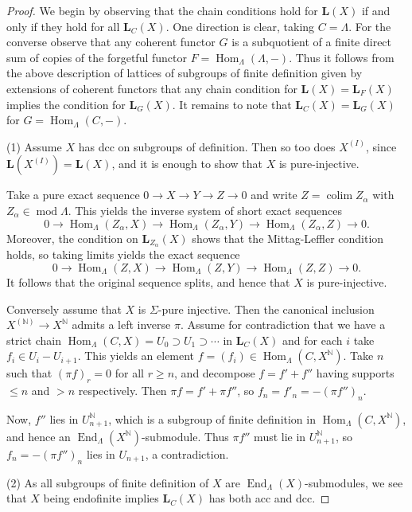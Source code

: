 \documentclass[a4paper]{amsart}
\theoremstyle{plain}
\theoremstyle{definition}
\theoremstyle{remark}
\numberwithin{equation}{section}
\newcommand{\colim}{\operatorname*{colim}}
\newcommand{\End}{\operatorname{End}}
\newcommand{\Hom}{\operatorname{Hom}}
\renewcommand{\mod}{\operatorname{mod}}
\def\bfL{\mathbf L}
\def\bfL{\mathbf L}
\def\bbN{\mathbb N}
\def\La{\Lambda}
\begin{document}
\begin{proof}
  We begin by observing that the chain conditions hold for $\bfL(X)$
  if and only if they hold for all $\bfL_C(X)$. One direction is
  clear, taking $C=\Lambda$. For the converse observe that any
  coherent functor $G$ is a subquotient of a finite direct sum of
  copies of the forgetful functor $F=\Hom_\La(\La,-)$.
  Thus it follows from the above description of lattices of subgroups
  of finite definition given by extensions of coherent functors that any chain
  condition for $\bfL(X)=\bfL_F(X)$ implies the condition for
  $\bfL_G(X)$. It remains to note that  $\bfL_C(X)=\bfL_G(X)$ for $G=\Hom_\La(C,-)$. 

(1) Assume $X$ has dcc on subgroups of definition. Then so too does $X^{(I)}$, since $\bfL(X^{(I)})=\bfL(X)$, and it is enough to show that $X$ is pure-injective.

Take a pure exact sequence $0\to X\to Y\to Z\to 0$ and write $Z=\colim Z_\alpha$ with $Z_\alpha\in\mod\Lambda$. This yields the inverse system of short exact sequences
\[ 0 \to \Hom_\Lambda(Z_\alpha,X) \to \Hom_\Lambda(Z_\alpha,Y) \to \Hom_\Lambda(Z_\alpha,Z) \to 0. \]
Moreover, the condition on $\bfL_{Z_\alpha}(X)$ shows that the Mittag-Leffler condition holds, so taking limits yields the exact sequence
\[ 0 \to \Hom_\Lambda(Z,X) \to \Hom_\Lambda(Z,Y) \to \Hom_\Lambda(Z,Z) \to 0. \]
It follows that the original sequence splits, and hence that $X$ is pure-injective.

Conversely assume that $X$ is $\Sigma$-pure injective. Then the canonical inclusion $X^{(\bbN)}\to X^\bbN$ admits a left inverse $\pi$. Assume for contradiction that we have a strict chain $\Hom_\Lambda(C,X)=U_0\supset U_1\supset\cdots$ in $\bfL_C(X)$ and for each $i$ take $f_i\in U_i-U_{i+1}$. This yields an element $f=(f_i)\in\Hom_\Lambda(C,X^\bbN)$. Take $n$ such that $(\pi f)_r=0$ for all $r\geq n$, and decompose $f=f'+f''$ having supports $\leq n$ and $>n$ respectively. Then $\pi f=f'+\pi f''$, so $f_n=f'_n=-(\pi f'')_n$.

Now, $f''$ lies in $U_{n+1}^\bbN$, which is a subgroup of finite definition in $\Hom_\Lambda(C,X^\bbN)$, and hence an $\End_\Lambda(X^\bbN)$-submodule. Thus $\pi f''$ must lie in $U_{n+1}^\bbN$, so $f_n=-(\pi f'')_n$ lies in $U_{n+1}$, a contradiction.
\medskip

(2) As all subgroups of finite definition of $X$ are $\End_\Lambda(X)$-submodules, we see that $X$ being endofinite implies $\bfL_C(X)$ has both acc and dcc.


\end{proof}
\end{document}
